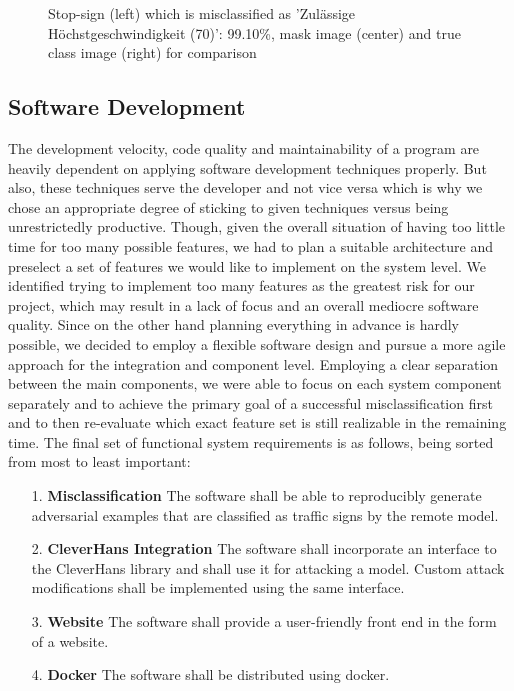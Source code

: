 \begin{figure}
\begin{subfigure}{.19\linewidth}
\end{subfigure}
\caption{Stop-sign (left) which is misclassified as 'Zulässige Höchstgeschwindigkeit (70)': 99.10\%, mask image (center) and true class image (right) for comparison}
\label{fig:stopsign}
\end{figure}

\subsection{Software Development}\label{subsec:sw_development}
The development velocity, code quality and maintainability of a program are heavily dependent on applying software development techniques properly.
But also, these techniques serve the developer and not vice versa which is why we chose an appropriate degree of sticking to given techniques versus being unrestrictedly productive.
Though, given the overall situation of having too little time for too many possible features, we had to plan a suitable architecture and preselect a set of features we would like to implement on the system level.
We identified trying to implement too many features as the greatest risk for our project, which may result in a lack of focus and an overall mediocre software quality.
Since on the other hand planning everything in advance is hardly possible, we decided to employ a flexible software design and pursue a more agile approach for the integration and component level.
Employing a clear separation between the main components, we were able to focus on each system component separately and to achieve the primary goal of a successful misclassification first and to then re-evaluate which exact feature set is still realizable in the remaining time.
The final set of functional system requirements is as follows, being sorted from most to least important:
\begin{enumerate}
	\item[1.] \textbf{Misclassification}
	The software shall be able to reproducibly generate adversarial examples that are classified as traffic signs by the remote model.
	\item[2.] \textbf{CleverHans Integration}
	The software shall incorporate an interface to the CleverHans library and shall use it for attacking a model. Custom attack modifications shall be implemented using the same interface.
	\item[3.] \textbf{Website}
	The software shall provide a user-friendly front end in the form of a website.
	\item[4.] \textbf{Docker}
	The software shall be distributed using docker.
\end{enumerate}

